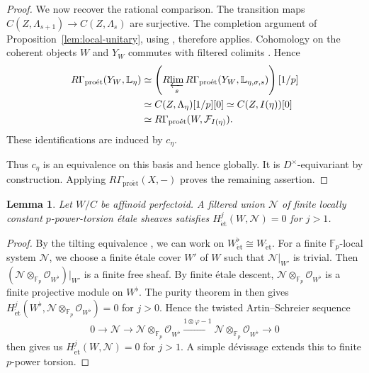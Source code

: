 \documentclass[11pt]{article}
\newtheorem{lemma}[theorem]{Lemma}
\theoremstyle{definition}
\newcommand{\cF}{\mathcal F}
\newcommand{\proet}{\mathrm{pro\acute et}}
\newcommand{\et}{\mathrm{\acute et}}
\begin{document}
\begin{proof}
We now recover the rational comparison.
The transition maps
$C(Z,\Lambda_{s+1})\to C(Z,\Lambda_s)$ are surjective.
The completion argument of Proposition~\ref{lem:local-unitary},
using \cite[Lemma~3.18]{ScholzeRigid}, therefore applies.
Cohomology on the coherent objects $W$ and $Y_W$ commutes
with filtered colimits
\cite[Proposition~3.12]{ScholzeRigid}.
Hence
\begin{align*}
 R\Gamma_{\proet}(Y_W,\mathbb L_\eta)
 &\simeq
 \left(R\!\varprojlim_s
 R\Gamma_{\proet}(Y_W,\mathbb L_{\eta,\sigma,s})\right)[1/p]\\
 &\simeq C(Z,\Lambda_\eta)[1/p][0]
 \simeq C(Z,I(\eta))[0]\\
 &\simeq R\Gamma_{\proet}(W,\cF_{I(\eta)}).
\end{align*}
These identifications are induced by $c_\eta$.

Thus $c_\eta$ is an equivalence on this basis and hence globally.
It is $D^\times$-equivariant by construction.
Applying $R\Gamma_{\proet}(X,-)$ proves the remaining assertion.
\end{proof}


\begin{lemma}%
\label{lem:perfectoid-arithmetic-degree}
Let \(W/C\) be affinoid perfectoid.  A filtered union \(\mathcal N\)
of finite locally constant \(p\)-power-torsion \'etale sheaves
satisfies
\(
 H^j_{\et}(W,\mathcal N)=0\) for \(j>1\).
\end{lemma}
\begin{proof}
By the tilting equivalence \cite[Theorem~7.12]{ScholzePerfectoid}, we can work
on \(W^\flat_{\et}\cong W_{\et}\).  For a finite \(\mathbb F_p\)-local system
\(\mathcal N\), we choose a finite \'etale cover $W'$ of $W$ such that $\mathcal{N}|_{W'}$ is trivial.
Then \((\mathcal N\otimes_{\mathbb F_p}\mathscr O_{W^\flat})|_{W'}\) is a finite free sheaf.
By finite \'etale descent, $\mathcal N\otimes_{\mathbb F_p}\mathscr O_{W^\flat}$ is a finite projective module on $W^\flat$.  
The purity theorem in \cite[Theorem~7.9 and Proposition~7.13]{ScholzePerfectoid}
then gives \(H^j_{\et}(W^\flat,\mathcal N\otimes_{\mathbb F_p}\mathscr O_{W^\flat})=0\) for \(j>0\).
Hence the twisted Artin--Schreier sequence
\begin{equation*}
 0\longrightarrow\mathcal N
 \longrightarrow\mathcal N\otimes_{\mathbb F_p}\mathscr O_{W^\flat}
 \xrightarrow{1\otimes\varphi-1}
 \mathcal N\otimes_{\mathbb F_p}\mathscr O_{W^\flat}
 \longrightarrow0
\end{equation*}
then gives us \(H^j_{\et}(W,\mathcal N)=0\) for \(j>1\).
A simple d\'evissage extends this to finite \(p\)-power torsion.
\end{proof}
\end{document}
